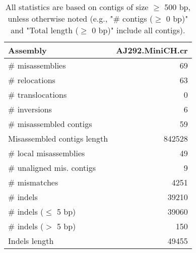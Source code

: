 \documentclass[12pt,a4paper]{article}
\begin{document}
\begin{table}[ht]
\begin{center}
\caption{All statistics are based on contigs of size $\geq$ 500 bp, unless otherwise noted (e.g., "\# contigs ($\geq$ 0 bp)" and "Total length ($\geq$ 0 bp)" include all contigs).}
\begin{tabular}{|l*{1}{|r}|}
\hline
Assembly & AJ292.MiniCH.cr \\ \hline
\# misassemblies & 69 \\ \hline
\hspace{5mm}\# relocations & 63 \\ \hline
\hspace{5mm}\# translocations & 0 \\ \hline
\hspace{5mm}\# inversions & 6 \\ \hline
\# misassembled contigs & 59 \\ \hline
Misassembled contigs length & 842528 \\ \hline
\# local misassemblies & 49 \\ \hline
\# unaligned mis. contigs & 9 \\ \hline
\# mismatches & 4251 \\ \hline
\# indels & 39210 \\ \hline
\hspace{5mm}\# indels ($\leq$ 5 bp) & 39060 \\ \hline
\hspace{5mm}\# indels ($>$ 5 bp) & 150 \\ \hline
Indels length & 49455 \\ \hline
\end{tabular}
\end{center}
\end{table}
\end{document}
